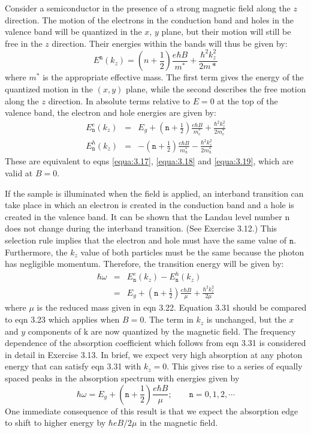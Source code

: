 \documentclass[12pt]{book}
\begin{document}
Consider a semiconductor in the presence of a strong magnetic field along the $z$ direction. The motion of the electrons in the conduction band and holes in the valence band will be quantized in the $x$, $y$ plane, but their motion will still be free in the $z$ direction. Their energies within the bands will thus be given by:
\begin{equation}\label{equa:3.29}
  E^{\texttt{n}}(k_z)=(n+\frac{1}{2})\frac{e\hbar B}{m^*}+\frac{\hbar^2k_z^2}{2m*}
\end{equation}
where $m^*$ is the appropriate effective mass. The first term gives the energy of the quantized motion in the $(x, y)$ plane, while the second describes the free motion along the $z$ direction. In absolute terms relative to $E = 0$ at the top of the valence band, the electron and hole energies are given by:
\begin{eqnarray}
\nonumber  E_{\texttt{n}}^e(k_z) &=& E_g+(\texttt{n}+\frac{1}{2})\frac{e\hbar B}{m_e^*}+\frac{\hbar^2k_z^2}{2m_e^*}  \label{equa:3.30}\\
  E_{\texttt{n}}^h(k_z) &=& -(\texttt{n}+\frac{1}{2})\frac{e\hbar B}{m_h^*}-\frac{\hbar^2k_z^2}{2m_h^*} \label{equa:3.31}
\end{eqnarray}
These are equivalent to eqns \ref{equa:3.17}, \ref{equa:3.18} and \ref{equa:3.19}, which are valid at $B = 0$.

If the sample is illuminated when the field is applied, an interband transition can take place in which an electron is created in the conduction band and a hole is created in the valence band. It can be shown that the Landau level number n does not change during the interband transition. (See Exercise 3.12.) This selection rule implies that the electron and hole must have the same value of $\texttt{n}$. Furthermore, the $k_z$ value of both particles must be the same because the photon has negligible momentum. Therefore, the transition energy will be given by:
\begin{eqnarray}
\nonumber  \hbar\omega &=& E_{\texttt{n}}^e(k_z)-E_{\texttt{n}}^h(k_z) \\
   &=& E_g+(\texttt{n}+\frac{1}{2})\frac{e\hbar B}{\mu}+\frac{\hbar^2k_z^2}{2\mu} \label{equa:3.32}
\end{eqnarray}
where $\mu$ is the reduced mass given in eqn 3.22. Equation 3.31 should be compared to eqn 3.23 which applies when $B = 0$. The term in $k_z$ is unchanged, but the $x$ and $y$ components of $\mathrm{k}$ are now quantized by the magnetic field. The frequency dependence of the absorption coefficient which follows from eqn 3.31 is considered in detail in Exercise 3.13. In brief, we expect very high absorption at any photon energy that can satisfy eqn 3.31 with $k_z=0$. This gives rise to a series of equally spaced peaks in the absorption spectrum with energies given by
\begin{equation}\label{equa:3.32}
  \hbar\omega=E_g+(\texttt{n}+\frac{1}{2})\frac{e\hbar B}{\mu};\qquad \texttt{n}=0,1,2,\cdots
\end{equation}
One immediate consequence of this result is that we expect the absorption edge to shift to higher energy by $\hbar eB/2\mu$ in the magnetic field.
\end{document}
